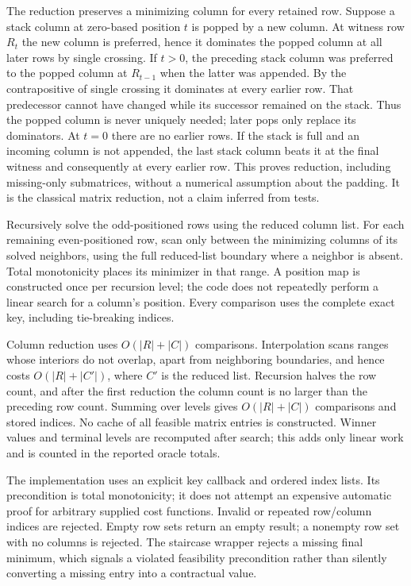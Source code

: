 The reduction preserves a minimizing column for every retained row. Suppose a stack column at zero-based position $t$ is popped by a new column. At witness row $R_t$ the new column is preferred, hence it dominates the popped column at all later rows by single crossing. If $t>0$, the preceding stack column was preferred to the popped column at $R_{t-1}$ when the latter was appended. By the contrapositive of single crossing it dominates at every earlier row. That predecessor cannot have changed while its successor remained on the stack. Thus the popped column is never uniquely needed; later pops only replace its dominators. At $t=0$ there are no earlier rows. If the stack is full and an incoming column is not appended, the last stack column beats it at the final witness and consequently at every earlier row. This proves reduction, including missing-only submatrices, without a numerical assumption about the padding. It is the classical matrix reduction, not a claim inferred from tests.

Recursively solve the odd-positioned rows using the reduced column list. For each remaining even-positioned row, scan only between the minimizing columns of its solved neighbors, using the full reduced-list boundary where a neighbor is absent. Total monotonicity places its minimizer in that range. A position map is constructed once per recursion level; the code does not repeatedly perform a linear search for a column's position. Every comparison uses the complete exact key, including tie-breaking indices.

Column reduction uses $O(|R|+|C|)$ comparisons. Interpolation scans ranges whose interiors do not overlap, apart from neighboring boundaries, and hence costs $O(|R|+|C'|)$, where $C'$ is the reduced list. Recursion halves the row count, and after the first reduction the column count is no larger than the preceding row count. Summing over levels gives $O(|R|+|C|)$ comparisons and stored indices. No cache of all feasible matrix entries is constructed. Winner values and terminal levels are recomputed after search; this adds only linear work and is counted in the reported oracle totals.

The implementation uses an explicit key callback and ordered index lists. Its precondition is total monotonicity; it does not attempt an expensive automatic proof for arbitrary supplied cost functions. Invalid or repeated row/column indices are rejected. Empty row sets return an empty result; a nonempty row set with no columns is rejected. The staircase wrapper rejects a missing final minimum, which signals a violated feasibility precondition rather than silently converting a missing entry into a contractual value.

